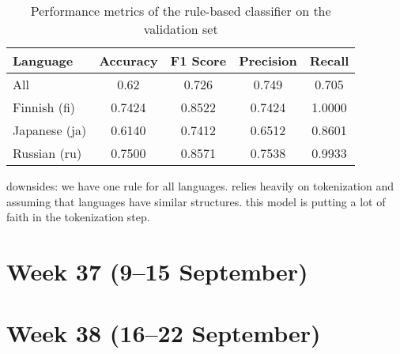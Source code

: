 \documentclass{article}
\begin{document}
\begin{enumerate}
    \begin{table}[h]
        \centering
        \begin{tabular}{|l|c|c|c|c|}
            \hline
            Language & Accuracy & F1 Score & Precision & Recall \\
            \hline
            All & 0.62 & 0.726 & 0.749 & 0.705 \\
            Finnish (fi) & 0.7424 & 0.8522 & 0.7424 & 1.0000 \\
            Japanese (ja) & 0.6140 & 0.7412 & 0.6512 & 0.8601 \\
            Russian (ru) & 0.7500 & 0.8571 & 0.7538 & 0.9933 \\
            \hline
        \end{tabular}
        \caption{Performance metrics of the rule-based classifier on the validation set}
        \label{tab:classifier_performance}
    \end{table}

    downsides:
        we have one rule for all languages. relies heavily on tokenization and assuming that languages have similar structures.
        this model is putting a lot of faith in the tokenization step.

\end{enumerate}

\section{Week 37 (9--15 September)}

\section{Week 38 (16--22 September)}
\end{document}
